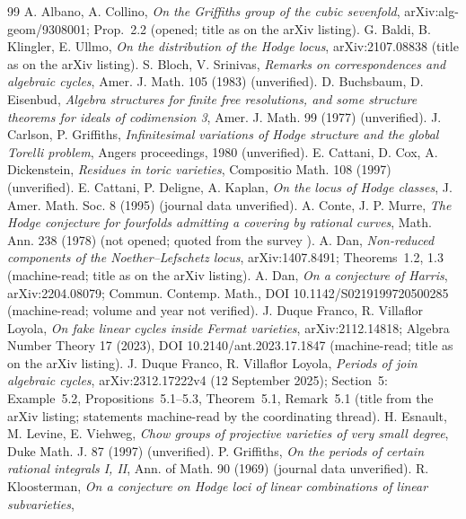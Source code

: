 \documentclass[10pt]{article}
\numberwithin{equation}{section}
\theoremstyle{remark}
\begin{document}
\begin{thebibliography}{99}\footnotesize\setlength{\itemsep}{0pt}\setlength{\parskip}{0pt}
 A. Albano, A. Collino, \emph{On the Griffiths group of the cubic sevenfold}, arXiv:alg-geom/9308001;
Prop.~2.2 (opened; title as on the arXiv listing).
 G. Baldi, B. Klingler, E. Ullmo, \emph{On the distribution of the Hodge locus}, arXiv:2107.08838
(title as on the arXiv listing).
 S. Bloch, V. Srinivas, \emph{Remarks on correspondences and algebraic cycles}, Amer. J. Math. 105
(1983) (unverified).
 D. Buchsbaum, D. Eisenbud, \emph{Algebra structures for finite free resolutions, and some structure
theorems for ideals of codimension 3}, Amer. J. Math. 99 (1977) (unverified).
 J. Carlson, P. Griffiths, \emph{Infinitesimal variations of Hodge structure and the global Torelli
problem}, Angers proceedings, 1980 (unverified).
 E. Cattani, D. Cox, A. Dickenstein, \emph{Residues in toric varieties}, Compositio Math. 108 (1997)
(unverified).
 E. Cattani, P. Deligne, A. Kaplan, \emph{On the locus of Hodge classes}, J. Amer. Math. Soc. 8
(1995) (journal data unverified).
 A. Conte, J. P. Murre, \emph{The Hodge conjecture for fourfolds admitting a covering by rational
curves}, Math. Ann. 238 (1978) (not opened; quoted from the survey \cite{Sur}).
 A. Dan, \emph{Non-reduced components of the Noether--Lefschetz locus}, arXiv:1407.8491;
Theorems~1.2, 1.3 (machine-read; title as on the arXiv listing).
 A. Dan, \emph{On a conjecture of Harris}, arXiv:2204.08079; Commun. Contemp. Math.,
DOI 10.1142/S0219199720500285 (machine-read; volume and year not verified).
 J. Duque Franco, R. Villaflor Loyola, \emph{On fake linear cycles inside Fermat varieties},
arXiv:2112.14818; Algebra Number Theory 17 (2023), DOI 10.2140/ant.2023.17.1847 (machine-read; title as on the
arXiv listing).
 J. Duque Franco, R. Villaflor Loyola, \emph{Periods of join algebraic cycles},
arXiv:2312.17222v4 (12 September 2025); Section~5: Example~5.2, Propositions~5.1--5.3, Theorem~5.1, Remark~5.1
(title from the arXiv listing; statements machine-read by the coordinating thread).
 H. Esnault, M. Levine, E. Viehweg, \emph{Chow groups of projective varieties of very small degree},
Duke Math. J. 87 (1997) (unverified).
 P. Griffiths, \emph{On the periods of certain rational integrals I, II}, Ann. of Math. 90 (1969)
(journal data unverified).
 R. Kloosterman, \emph{On a conjecture on Hodge loci of linear combinations of linear subvarieties},

\end{thebibliography}
\end{document}
